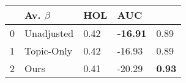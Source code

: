 \begin{tabular}{lllll}
\toprule
{} & Av. $\beta$ &              HOL &            AUC \\
\midrule
0 &  Unadjusted &        0.42 &  \textbf{-16.91} &           0.89 \\
1 &  Topic-Only &        0.42 &           -16.93 &           0.89 \\
2 &        Ours &        0.41 &           -20.29 &  \textbf{0.93} \\
\bottomrule
\end{tabular}
